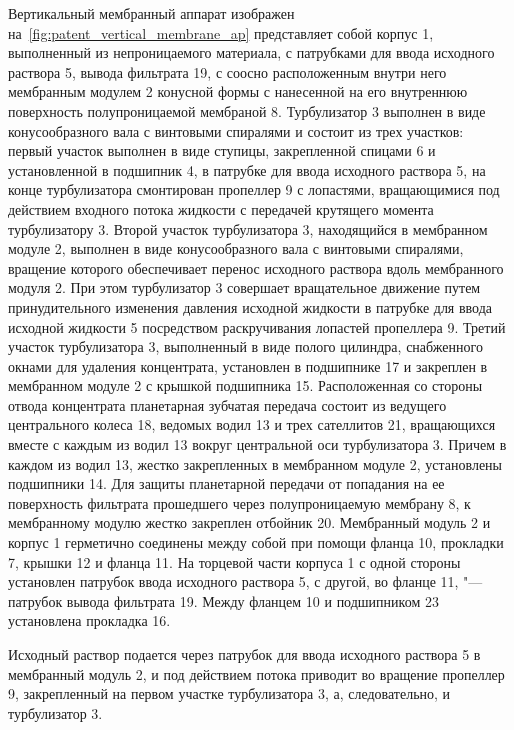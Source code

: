 Вертикальный мембранный аппарат изображен на~\cref{fig:patent_vertical_membrane_ap} представляет собой корпус 1, выполненный из непроницаемого материала, с патрубками для ввода исходного раствора 5, вывода фильтрата 19, с соосно расположенным внутри него мембранным модулем 2 конусной формы с нанесенной на его внутреннюю поверхность полупроницаемой мембраной 8.
Турбулизатор 3 выполнен в виде конусообразного вала с винтовыми спиралями и состоит из трех участков: первый участок выполнен в виде ступицы, закрепленной спицами 6 и установленной в подшипник 4, в патрубке для ввода исходного раствора 5, на конце турбулизатора смонтирован пропеллер 9 с лопастями, вращающимися под действием входного потока жидкости с передачей крутящего момента турбулизатору 3.
Второй участок турбулизатора 3, находящийся в мембранном модуле 2, выполнен в виде конусообразного вала с винтовыми спиралями, вращение которого обеспечивает перенос исходного раствора вдоль мембранного модуля 2.
При этом турбулизатор 3 совершает вращательное движение путем принудительного изменения давления исходной жидкости в патрубке для ввода исходной жидкости 5 посредством раскручивания лопастей пропеллера 9.
Третий участок турбулизатора 3, выполненный в виде полого цилиндра, снабженного окнами для удаления концентрата, установлен в подшипнике 17 и закреплен в мембранном модуле 2 с крышкой подшипника 15.
Расположенная со стороны отвода концентрата планетарная зубчатая передача состоит из ведущего центрального колеса 18, ведомых водил 13 и трех сателлитов 21, вращающихся вместе с каждым из водил 13 вокруг центральной оси турбулизатора 3.
Причем в каждом из водил 13, жестко закрепленных в мембранном модуле 2, установлены подшипники 14.
Для защиты планетарной передачи от попадания на ее поверхность фильтрата прошедшего через полупроницаемую мембрану 8, к мембранному модулю жестко закреплен отбойник 20.
Мембранный модуль 2 и корпус 1 герметично соединены между собой при помощи фланца 10, прокладки 7, крышки 12 и фланца 11.
На торцевой части корпуса 1 с одной стороны установлен патрубок ввода исходного раствора 5, с другой, во фланце 11, "--- патрубок вывода фильтрата 19.
Между фланцем 10 и подшипником 23 установлена прокладка 16.

Исходный раствор подается через патрубок для ввода исходного раствора 5 в мембранный модуль 2, и под действием потока приводит во вращение пропеллер 9, закрепленный на первом участке турбулизатора 3, а, следовательно, и турбулизатор 3. 


